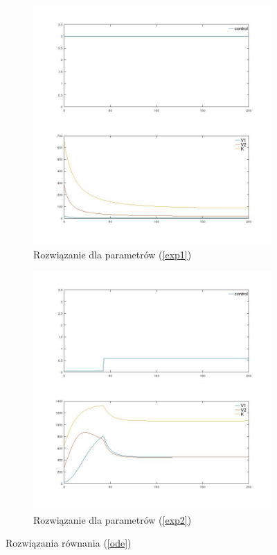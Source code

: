 \documentclass[11pt]{article}
\begin{document}
\begin{figure}[h]
  \begin{subfigure}{.5\textwidth}
    \caption{Rozwiązanie dla parametrów (\ref{exp1})}\label{max_sol}
    \includegraphics[width=\textwidth]{plot_max}
  \end{subfigure}
    \begin{subfigure}{.5\textwidth}
    \caption{Rozwiązanie dla parametrów (\ref{exp2})}\label{bang_sol}
    \includegraphics[width=\textwidth]{plot_bang}
  \end{subfigure}%
  \caption{Rozwiązania równania (\ref{ode})}\label{ode_sol}
\end{figure}
\end{document}
